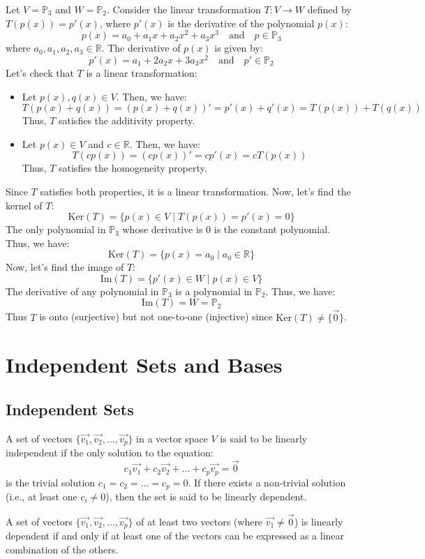 \begin{eg}
    Let $V = \mathbb{P}_3$ and $W = \mathbb{P}_2$. Consider the linear transformation $T: V \to W$ defined by $T(p(x)) = p'(x)$, where $p'(x)$ is the derivative of the polynomial $p(x)$:
    \[ p(x) = a_0 + a_1 x + a_2 x^2 + a_3 x^3 \quad \text{and} \quad p \in \mathbb{P}_3 \]
    where $a_0, a_1, a_2, a_3 \in \mathbb{R}$. The derivative of $p(x)$ is given by:
    \[ p'(x) = a_1 + 2a_2 x + 3a_3 x^2 \quad \text{and} \quad p' \in \mathbb{P}_2 \]
    Let's check that $T$ is a linear transformation:
    \begin{itemize}[itemsep=1pt,label=$\circ$]
        \item Let $p(x), q(x) \in V$. Then, we have:
        \[ T(p(x) + q(x)) = (p(x) + q(x))' = p'(x) + q'(x) = T(p(x)) + T(q(x)) \]
        Thus, $T$ satisfies the additivity property.
        \item Let $p(x) \in V$ and $c \in \mathbb{R}$. Then, we have:
        \[ T(cp(x)) = (cp(x))' = c p'(x) = c T(p(x)) \]
        Thus, $T$ satisfies the homogeneity property.
    \end{itemize}
    Since $T$ satisfies both properties, it is a linear transformation. Now, let's find the kernel of $T$:
    \[ \text{Ker}(T) = \{ p(x) \in V \mid T(p(x)) = p'(x) = 0 \} \]
    The only polynomial in $\mathbb{P}_3$ whose derivative is $0$ is the constant polynomial. Thus, we have:
    \[ \text{Ker}(T) = \{ p(x) = a_0 \mid a_0 \in \mathbb{R} \} \]
    Now, let's find the image of $T$:
    \[ \text{Im}(T) = \{ p'(x) \in W \mid p(x) \in V \} \]
    The derivative of any polynomial in $\mathbb{P}_3$ is a polynomial in $\mathbb{P}_2$. Thus, we have:
    \[ \text{Im}(T) = W = \mathbb{P}_2 \]
    Thus $T$ is onto (surjective) but not one-to-one (injective) since $\text{Ker}(T) \neq \{\vec{0}\}$.
\end{eg}

\section{Independent Sets and Bases}
\subsection{Independent Sets}
\begin{definition}
    A set of vectors $\{\vec{v_1}, \vec{v_2}, \ldots, \vec{v_p}\}$ in a vector space $V$ is said to be linearly independent if the only solution to the equation:
    \[ c_1 \vec{v_1} + c_2 \vec{v_2} + \ldots + c_p \vec{v_p} = \vec{0} \]
    is the trivial solution $c_1 = c_2 = \ldots = c_p = 0$. If there exists a non-trivial solution (i.e., at least one $c_i \neq 0$), then the set is said to be linearly dependent.
\end{definition}
\begin{theorem}
    A set of vectors $\{\vec{v_1}, \vec{v_2}, \ldots, \vec{v_p}\}$ of at least two vectors (where $\vec{v_1} \neq \vec{0}$) is linearly dependent if and only if at least one of the vectors can be expressed as a linear combination of the others.
\end{theorem}

